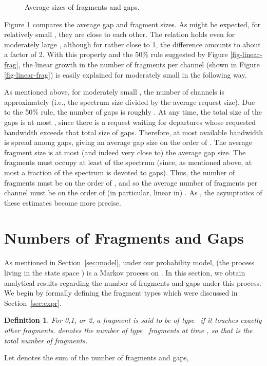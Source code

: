 \documentclass{amsart}
\newtheorem{defi}{Definition}
\begin{document}
\begin{figure}[!t]
\begin{center}
 \vspace*{-0.5cm}
 \caption{Average sizes of fragments and gaps.}
 \label{fig-size-frag-gap}
\end{center}
\end{figure}
Figure \ref{fig-size-frag-gap}  compares the  average gap and fragment sizes.  As might be expected, for relatively  small , they are close to each other.
The relation holds even for moderately  large , although for
 rather  close to  1, the difference  amounts to  about a factor  of 2.  With this
property and the 50\% rule suggested by Figure \ref{fig-linear-frag}, the linear growth in
the number of fragments per channel (shown in Figure \ref{fig-linear-frag}) is easily explained for moderately small  in the following way.



As mentioned above, for moderately small  , the number of channels is approximately  (i.e., the spectrum size divided by the average request
size). Due to the 50\% rule, the number  of gaps is roughly . At any time, the
total size of the gaps  is at most , since  there is a request waiting  for departures whose
requested bandwidth exceeds that total size of gaps. Therefore, at  most  available bandwidth is spread  among  gaps,
giving an average gap  size on the order of . The average fragment size is
at most (and indeed very close to) the average gap size. The fragments must occupy at least  of the spectrum (since, as mentioned above, at
most a fraction   of the spectrum is devoted to gaps).  Thus, the  number of fragments
must be on the  order of , and so the average  number of fragments per channel
must be on  the order of (in  particular, linear in) . As  , the  asymptotics of these
estimates become more precise.




\section{Numbers of Fragments and Gaps}\label{sec:behav}
As mentioned in Section~\ref{sec:model}, under our probability model,  (the process living in the state space )  is a Markov
process on . In this section, we obtain analytical results regarding the number of fragments and gaps under this process. We begin by formally defining the fragment types which were discussed in Section~\ref{sec:expr}.
\begin{defi}
For   0,1, or 2, a fragment is said to be of type~ if it touches
exactly  other fragments.   denotes the number of type~ fragments at time
, so that  is the total number of fragments.
\end{defi}
Let  denotes the sum of the number of fragments and gaps,
\end{document}
